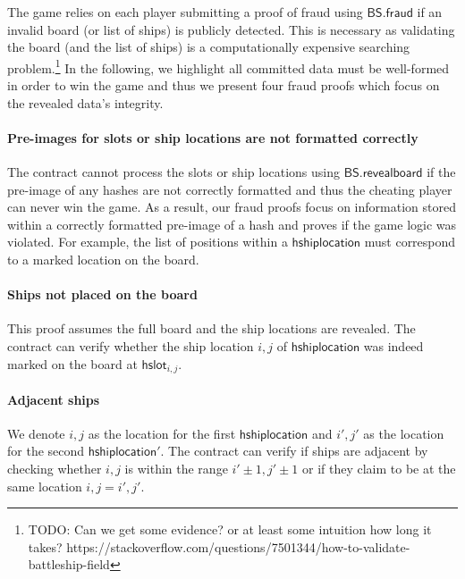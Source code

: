 \documentclass{llncs}
\newcommand{\hslot}{\mathsf{hslot}}
\newcommand{\hshiplocation}{\mathsf{hshiplocation}}
\newcommand{\battleshipfraud}{\mathsf{BS.fraud}}
\newcommand{\battleshiprevealboard}{\mathsf{BS.revealboard}}
\newcommand{\appcontract}{\mathsf{AC}}
\begin{document}
The game relies on each player submitting a proof of fraud using $\battleshipfraud$ if an invalid board (or list of ships) is publicly detected.
This is necessary as validating the board (and the list of ships) is a computationally expensive searching problem.\footnote{TODO: Can we get some evidence? or at least some intuition how long it takes? https://stackoverflow.com/questions/7501344/how-to-validate-battleship-field }  
In the following, we highlight all committed data must be well-formed in order to win the game and thus we present four fraud proofs which focus on the revealed data's integrity. 


\paragraph{Pre-images for slots or ship locations are not formatted correctly} 
The contract cannot process the slots or ship locations using $\battleshiprevealboard$ if the pre-image of any hashes are not correctly formatted and thus the cheating player can never win the game.
As a result, our fraud proofs focus on information stored within a correctly formatted pre-image of a hash and proves if the game logic was violated.
For example, the list of positions within a $\hshiplocation$ must correspond to a marked location on the board. 

\paragraph{Ships not placed on the board}
This proof assumes the full board and the ship locations are revealed. 
The contract can verify whether the ship location $i,j$ of $\hshiplocation$ was indeed marked on the board at $\hslot_{i,j}$. 

\paragraph{Adjacent ships} 
We denote $i,j$ as the location for the first $\hshiplocation$ and $i',j'$ as the location for the second  $\hshiplocation'$. 
The contract can verify if ships are adjacent by checking whether $i,j$ is within the range $i'\pm1, j'\pm1$ or if they claim to be at the same location $i,j = i',j'$.
\end{document}
